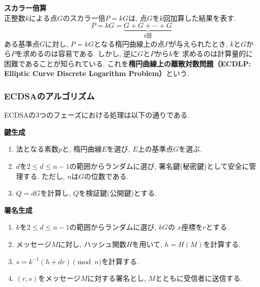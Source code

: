 \vspace{0.5em}
\noindent\textbf{スカラー倍算}\\
\indent 正整数$k$による点$G$のスカラー倍$P=kG$は, 点$G$を$k$回加算した結果を表す.
\[
  P=kG=\underbrace{G+G+\cdots+G}_{k\text{回}}
\]
\indent ある基準点$G$に対し, $P = kG$となる楕円曲線上の点$P$が与えられたとき, 
$k$と$G$から$P$を求めるのは容易である. しかし, 逆に$G$と$P$から$k$を
求めるのは計算量的に困難であることが知られている. 
これを\textbf{楕円曲線上の離散対数問題（ECDLP: Elliptic Curve Discrete Logarithm Problem）}という.\\

\subsubsection{ECDSAのアルゴリズム}
\indent ECDSAの3つのフェーズにおける処理は以下の通りである.
\vspace{1em}
\let\ltxlist\list
\begin{breakitembox}[l]{\textbf{鍵生成}}
  　
  \begin{enumerate}[parsep=7pt]
    \item 法となる素数$p$と, 楕円曲線$E$を選び, $E$上の基準点$G$を選ぶ.
    \item $d$を$2\leq d\leq n-1$の範囲からランダムに選び, 
    署名鍵(秘密鍵)として安全に管理する. ただし, $n$は$G$の位数である.
    \item $Q=dG$を計算し, $Q$を検証鍵(公開鍵)とする.
  \end{enumerate}
\end{breakitembox}
\vspace{1em}
\let\ltxlist\list
\begin{breakitembox}[l]{\textbf{署名生成}}
  　
  \begin{enumerate}[parsep=7pt]
    \item $k$を$2\leq d\leq n-1$の範囲からランダムに選び, $kG$の
    $x$座標を$r$とする.
    \item メッセージ$M$に対し, ハッシュ関数$H$を用いて, $h=H(M)$を計算する.
    \item $s=k^{-1}(h+dr)\pmod n$を計算する.
    \item $(r,s)$をメッセージ$M$に対する署名とし, 
    $M$とともに受信者に送信する.
  \end{enumerate}
\end{breakitembox}
\vspace{1em}
\let\ltxlist\list

